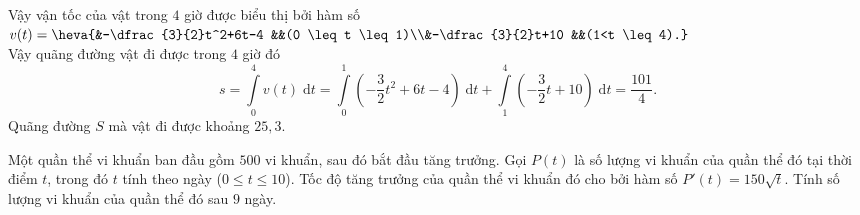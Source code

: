 \begin{bt}
{		Vậy vận tốc của vật trong $4$ giờ được biểu thị bởi hàm số $v(t)=\heva{&-\dfrac{3}{2}t^2+6t-4 &&(0 \leq t \leq 1)\\&-\dfrac{3}{2}t+10 &&(1<t \leq 4).}$\\
		Vậy quãng đường vật đi được trong $4$ giờ đó $$s=\displaystyle\int\limits_{0}^{4}v(t)\;\mathrm{d}t=\displaystyle\int\limits_{0}^{1}\left(-\dfrac{3}{2}t^2+6t-4\right)\;\mathrm{d}t+\displaystyle\int\limits_{1}^{4}\left(-\dfrac{3}{2}t+10\right)\;\mathrm{d}t=\dfrac{101}{4}.$$
		Quãng đường $S$ mà vật đi được khoảng $25,3$.
	}
\end{bt}

\begin{bt}%
	Một quần thể vi khuẩn ban đầu gồm $500$ vi khuẩn, sau đó bắt đầu tăng trưởng. Gọi $P(t)$ là số lượng vi khuẩn của quần thể đó tại thời điểm $t$, trong đó $t$ tính theo ngày ($0 \le t \le 10$). Tốc độ tăng trưởng của quần thể vi khuẩn đó cho bởi hàm số $P'(t) = 150 \sqrt{t}$. Tính số lượng vi khuẩn của quần thể đó sau $9$ ngày.
\end{bt}

